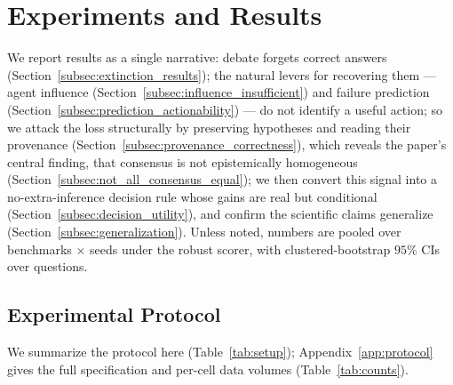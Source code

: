 \section{Experiments and Results}
\label{sec:experiments_results}

We report results as a single narrative: debate forgets correct answers
(Section~\ref{subsec:extinction_results}); the natural levers for recovering them --- agent influence
(Section~\ref{subsec:influence_insufficient}) and failure prediction
(Section~\ref{subsec:prediction_actionability}) --- do not identify a useful action; so we attack the loss
structurally by preserving hypotheses and reading their provenance
(Section~\ref{subsec:provenance_correctness}), which reveals the paper's central finding, that consensus is not
epistemically homogeneous (Section~\ref{subsec:not_all_consensus_equal}); we then convert this signal into a
no-extra-inference decision rule whose gains are real but conditional
(Section~\ref{subsec:decision_utility}), and confirm the scientific claims generalize
(Section~\ref{subsec:generalization}). Unless noted, numbers are pooled over benchmarks $\times$ seeds under the
robust scorer, with clustered-bootstrap $95\%$ CIs over questions.

\subsection{Experimental Protocol}
\label{subsec:experimental_protocol}

We summarize the protocol here (Table~\ref{tab:setup}); Appendix~\ref{app:protocol} gives the full
specification and per-cell data volumes (Table~\ref{tab:counts}).

